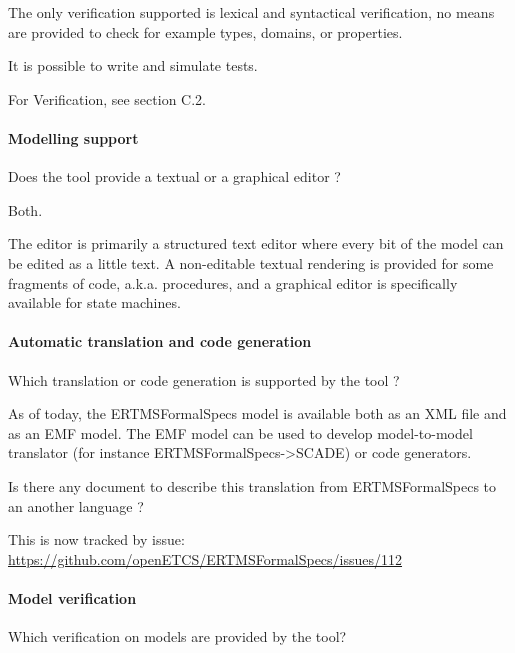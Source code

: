 \begin{assessor2}
The only verification supported is lexical and syntactical verification, no means are provided to check for example types, domains, or properties.

It is possible to write and simulate tests.

For Verification, see section C.2.
\end{assessor2}


\paragraph{Modelling support}
Does the tool provide a  textual or a graphical editor ?

\begin{author_comment}
Both.
\end{author_comment}

\begin{assessor1}
The editor is primarily a structured text editor where every bit of the model can be edited as a little text. 
A non-editable textual rendering is provided for some fragments of code, a.k.a. procedures, and a graphical editor is specifically available for state machines. 
\end{assessor1}

\paragraph{Automatic translation and code generation}
Which translation or code generation is supported by the tool ?

\begin{author_comment}
As of today, the ERTMSFormalSpecs model is available both as an XML file and as an EMF model. The EMF model can be used to develop model-to-model translator (for instance ERTMSFormalSpecs->SCADE) or code generators.
\end{author_comment}


\begin{assessor2}
Is there any document to describe this translation from ERTMSFormalSpecs to an another language ?
\end{assessor2}


\begin{author_comment}
This is now tracked by issue: \url{https://github.com/openETCS/ERTMSFormalSpecs/issues/112}
\end{author_comment}


\paragraph{Model verification}
Which verification on models are provided by the tool?

